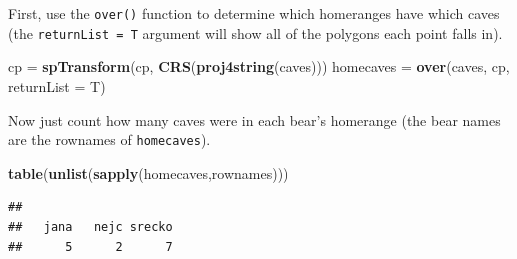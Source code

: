\documentclass[]{book}
\newenvironment{Shaded}{\begin{snugshade}}{\end{snugshade}}
\newcommand{\DataTypeTok}[1]{\textcolor[rgb]{0.13,0.29,0.53}{#1}}
\newcommand{\KeywordTok}[1]{\textcolor[rgb]{0.13,0.29,0.53}{\textbf{#1}}}
\newcommand{\NormalTok}[1]{#1}
\newcommand{\StringTok}[1]{\textcolor[rgb]{0.31,0.60,0.02}{#1}}
\begin{document}
First, use the \texttt{over()} function to determine which homeranges have which caves (the \texttt{returnList\ =\ T} argument will show all of the polygons each point falls in).

\begin{Shaded}
\begin{Highlighting}[]
\NormalTok{cp =}\StringTok{ }\KeywordTok{spTransform}\NormalTok{(cp, }\KeywordTok{CRS}\NormalTok{(}\KeywordTok{proj4string}\NormalTok{(caves)))}
\NormalTok{homecaves =}\StringTok{ }\KeywordTok{over}\NormalTok{(caves, cp, }\DataTypeTok{returnList =}\NormalTok{ T)}
\end{Highlighting}
\end{Shaded}

Now just count how many caves were in each bear's homerange (the bear names are the rownames of \texttt{homecaves}).

\begin{Shaded}
\begin{Highlighting}[]
\KeywordTok{table}\NormalTok{(}\KeywordTok{unlist}\NormalTok{(}\KeywordTok{sapply}\NormalTok{(homecaves,rownames)))}
\end{Highlighting}
\end{Shaded}

\begin{verbatim}
## 
##   jana   nejc srecko 
##      5      2      7
\end{verbatim}


\end{document}
